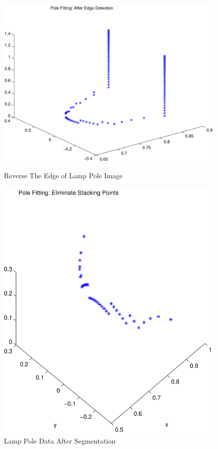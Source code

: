 \documentclass{cdcarta4}
\begin{document}
\begin{figure}[!htb]
    \begin{minipage}[t]{0.23\textwidth}
        \centering\includegraphics[width=\textwidth]{img/PoleFitAfterEdgeDet}
        \caption{Reverse The Edge of Lamp Pole Image} \label{fig:polefitafteredgedet}
    \end{minipage} %
    \begin{minipage}[t]{0.23\textwidth}
        \center\includegraphics[width=\textwidth]{img/PoleFitEliminateStacks} 
        \caption{Lamp Pole Data After Segmentation} \label{fig:polefitElm}
    \end{minipage}
\end{figure}
\end{document}
